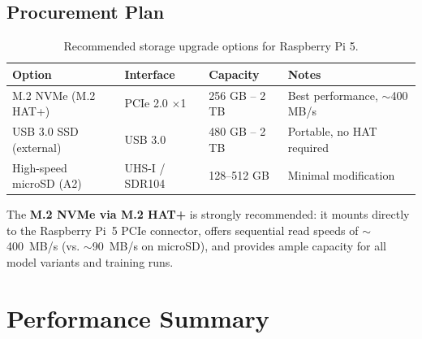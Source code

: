 \documentclass[12pt,a4paper]{article}
\begin{document}
\subsection{Procurement Plan}

\begin{table}[H]
\centering
\caption{Recommended storage upgrade options for Raspberry Pi 5.}
\label{tab:storage}
\begin{tabular}{@{}llll@{}}
\toprule
\textbf{Option}            & \textbf{Interface}  & \textbf{Capacity}  & \textbf{Notes} \\
\midrule
M.2 NVMe (M.2 HAT+)       & PCIe 2.0 $\times$1  & 256 GB -- 2 TB     & Best performance, $\sim$400 MB/s \\
USB 3.0 SSD (external)    & USB 3.0             & 480 GB -- 2 TB     & Portable, no HAT required \\
High-speed microSD (A2)   & UHS-I / SDR104      & 128--512 GB        & Minimal modification \\
\bottomrule
\end{tabular}
\end{table}

The \textbf{M.2 NVMe via M.2 HAT+} is strongly recommended: it mounts directly
to the Raspberry Pi~5 PCIe connector, offers sequential read speeds of
$\sim$400~MB/s (vs. $\sim$90~MB/s on microSD), and provides ample capacity
for all model variants and training runs.

\section{Performance Summary}
\end{document}
